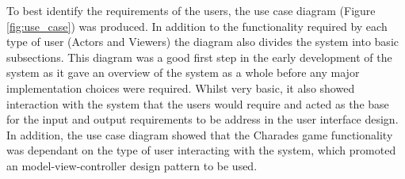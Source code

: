 To best identify the requirements of the users, the use case diagram (Figure \ref{fig:use_case}) was produced. In addition to the functionality required by each type of user (Actors and Viewers) the diagram also divides the system into basic subsections. This diagram was a good first step in the early development of the system as it gave an overview of the system as a whole before any major implementation choices were required. Whilst very basic, it also showed interaction with the system that the users would require and acted as the base for the input and output requirements to be address in the user interface design. In addition, the use case diagram showed that the Charades game functionality was dependant on the type of user interacting with the system, which promoted an model-view-controller design pattern to be used.

\newpage

